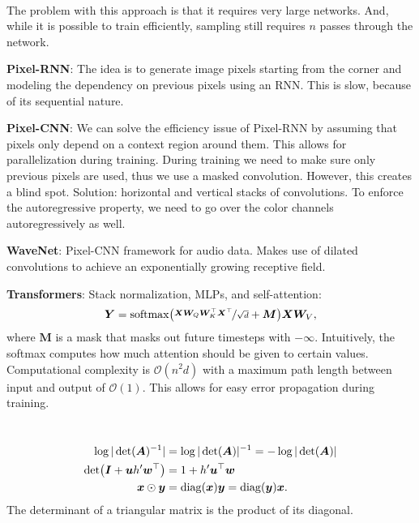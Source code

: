 \documentclass{article}
\newcommand{\lft}{\mathopen{}\mathclose\bgroup\left}
\newcommand{\rgt}{\aftergroup\egroup\right}
\renewcommand{\vec}[1]{\bm{#1}}
\newcommand{\mat}[1]{\bm{#1}}
\newenvironment{topic}[1]
{\textbf{\sffamily \colorbox{black}{\rlap{\textbf{\textcolor{white}{#1}}}\hspace{\linewidth}\hspace{-2\fboxsep}}} \\ \vspace{0.2cm}}
{}
\begin{document}
\begin{multicols*}{2}
\begin{topic}{Autoregressive models}
        The problem with this approach is that it requires very large networks. And, while it is possible
        to train efficiently, sampling still requires $n$ passes through the network.

        \textbf{Pixel-RNN}: The idea is to generate image pixels starting from the corner and
        modeling the dependency on previous pixels using an RNN. This is slow, because of its
        sequential nature.

        \textbf{Pixel-CNN}: We can solve the efficiency issue of Pixel-RNN by assuming that pixels
        only depend on a context region around them. This allows for parallelization during training.
        During training we need to make sure only previous pixels are used, thus we use a masked
        convolution. However, this creates a blind spot. Solution: horizontal and vertical stacks of
        convolutions. To enforce the autoregressive property, we need to go over the color channels
        autoregressively as well.

        \textbf{WaveNet}: Pixel-CNN framework for audio data. Makes use of dilated convolutions to
        achieve an exponentially growing receptive field.


        \textbf{Transformers}: Stack normalization, MLPs, and self-attention: \[
            \mat{Y} = \mathrm{softmax}\lft( \nicefrac{\mat{X} \mat{W}_Q \mat{W}_K^\top \mat{X}^\top}{\sqrt{d}} + \mat{M} \rgt) \mat{X} \mat{W}_V,
        \]
        where $\mat{M}$ is a mask that masks out future timesteps with $-\infty$. Intuitively, the softmax
        computes how much attention should be given to certain values. Computational complexity is
        $\mathcal{O}(n^2d)$ with a maximum path length between input and output of $\mathcal{O}(1)$. This
        allows for easy error propagation during training.
    \end{topic}

    \begin{topic}{Normalizing flow}
        \begin{align*}
            \log |\det(\mat{A})^{-1}|                          & = \log |\det(\mat{A})|^{-1} = -\log |\det(\mat{A})|                \\
            \det \lft( \mat{I} + \vec{u} h' \vec{w}^\top \rgt) & = 1 + h' \vec{u}^\top \vec{w}                                      \\
            \vec{x} \odot \vec{y}                              & = \mathrm{diag}(\vec{x}) \vec{y} = \mathrm{diag}(\vec{y}) \vec{x}.
        \end{align*}
        The determinant of a triangular matrix is the product of its diagonal.


\end{topic}
\end{multicols*}
\end{document}
